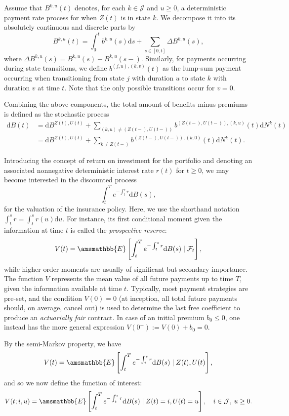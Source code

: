 \documentclass[11pt,leqno]{amsart}
\numberwithin{table}{section}
\numberwithin{figure}{section}
\numberwithin{equation}{section}
\newcommand{\dd}{\mathrm{d}}
\newcommand{\1}{{\mathds{1}}}
\newcommand{\0}{\mat{0}}
\newcommand{\E}{\amsmathbb{E}}
\begin{document}
Assume that $B^{k,u}(t)$ denotes, for each $k\in\mathcal{J}$ and $u\ge0$, a deterministic payment rate process for when $Z(t)$ is in state $k$. We decompose it into its absolutely continuous and discrete parts by
\[ B^{k,u}(t)=\int_0^t b^{k,u}(s)\dd s +\sum_{s\in[0,t]}\Delta B^{k,u}(s), \]
where $\Delta B^{k,u}(s)=B^{k,u}(s)-B^{k,u}(s-)$. Similarly, for payments occurring during state transitions, we define $b^{(j,u),(k,v)}(t)$ as the lump-sum payment occurring when transitioning from state $j$ with duration $u$ to state $k$ with duration $v$ at time $t$. Note that the only possible transitions occur for $v=0$.

Combining the above components, the total amount of benefits minus premiums is defined as the stochastic process
\[ \begin{split}
\dd B(t)&= \dd B^{Z(t),U(t)} + \sum_{(k,u)\neq (Z(t-),U(t-))}b^{(Z(t-),U(t-)),(k,u)}(t) \dd N^{k}(t)\\
&=\dd B^{Z(t),U(t)} + \sum_{k \neq Z(t-)}b^{(Z(t-),U(t-)),(k,0)}(t) \dd N^{k}(t).
\end{split} \]

Introducing the concept of return on investment for the portfolio and denoting an associated nonnegative deterministic interest rate $r(t)$ for $t\ge 0$, we may become interested in the discounted process 
\[ \int_t^T e^{-\int_t^s r}\dd B(s), \]
for the valuation of the insurance policy. Here, we use the shorthand notation $\int_t^s r=\int_t^s r(u)\dd u$. For instance, its first conditional moment given the information at time $t$ is called the {\textit{prospective reserve}}:
\[ V(t)=\E\left[\int_t^T e^{-\int_t^s r}\dd B(s) \mid \mathcal{F}_t\right], \]
while higher-order moments are usually of significant but secondary importance. The function $V$ represents the mean value of all future payments {up to time $T$}, given the information available at time $t$. Typically, most payment strategies are pre-set, and the condition {$V(0)=0$ (at inception, all total future payments should, on average, cancel out) is used to determine the last free coefficient to produce an \textit{actuarially fair} contract. In  case of an initial premium $b_0\le 0$, one instead has the more general expression $V(0^-) := V(0) + b_0 = 0$.}

By the semi-Markov property, we have
\[ V(t)=\E\left[\int_t^T e^{-\int_t^s r}\dd B(s) \mid Z(t),U(t)\right], \]
and so we now define the function of interest:
\[ V(t;i,u)=\E\left[\int_t^T e^{-\int_t^s r}\dd B(s) \mid Z(t)=i,U(t)=u\right],\quad i\in\mathcal{J},\: u\ge0. \]
\end{document}
